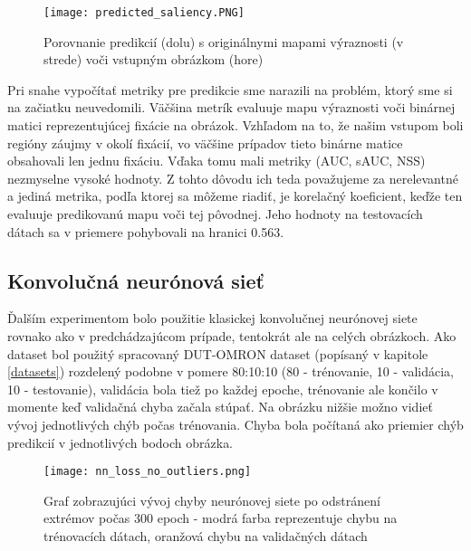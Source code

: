 \begin{figure}[H]
	\begin{center}
		\texttt{[image: predicted\_saliency.PNG]}
		\caption[Porovnanie prvotných výsledkov]{
			Porovnanie predikcií (dolu) s originálnymi mapami výraznosti (v strede) voči vstupným obrázkom (hore)
		}\label{results_image}
	\end{center}
\end{figure}

Pri snahe vypočítať metriky pre predikcie sme narazili na problém, ktorý sme si na začiatku neuvedomili. Väčšina metrík evaluuje mapu výraznosti voči binárnej matici reprezentujúcej fixácie na obrázok. Vzhľadom na to, že našim vstupom boli regióny záujmy v okolí fixácií, vo väčšine prípadov tieto binárne matice obsahovali len jednu fixáciu. Vďaka tomu mali metriky (AUC, sAUC, NSS) nezmyselne vysoké hodnoty. Z tohto dôvodu ich teda považujeme za nerelevantné a jediná metrika, podľa ktorej sa môžeme riadiť, je korelačný koeficient, keďže ten evaluuje predikovanú mapu voči tej pôvodnej. Jeho hodnoty na testovacích dátach sa v priemere pohybovali na hranici 0.563.

\subsection{Konvolučná neurónová sieť}
\label{experiments_cnn}

Ďalším experimentom bolo použitie klasickej konvolučnej neurónovej siete rovnako ako v predchádzajúcom prípade, tentokrát ale na celých obrázkoch. Ako dataset bol použitý spracovaný DUT-OMRON dataset (popísaný v kapitole \ref{datasets}) rozdelený podobne v pomere 80:10:10 (80 - trénovanie, 10 - validácia, 10 - testovanie), validácia bola tiež po každej epoche, trénovanie ale končilo v momente keď validačná chyba začala stúpať. Na obrázku nižšie možno vidieť vývoj jednotlivých chýb počas trénovania. Chyba bola počítaná ako priemier chýb predikcií v jednotlivých bodoch obrázka.

\begin{figure}[H]
	\begin{center}
	\texttt{[image: nn\_loss\_no\_outliers.png]}
		\caption[Vývoj chyby počas trénovania konvolučnej neurónovej siete]{
			Graf zobrazujúci vývoj chyby neurónovej siete po odstránení extrémov počas 300 epoch - modrá farba reprezentuje chybu na trénovacích dátach, oranžová chybu na validačných dátach
		}\label{cnn_loss_outliers}
	\end{center}
\end{figure}

